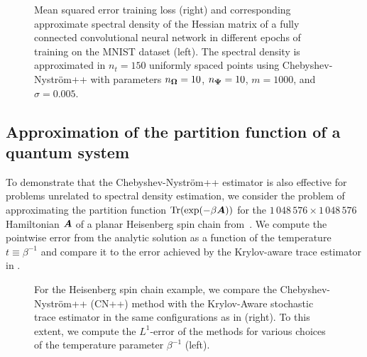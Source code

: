 \begin{figure}
    \begin{minipage}[c]{.49\linewidth}
        \centering
        
    \end{minipage}\hfill%
    \begin{minipage}[c]{.49\linewidth}
        \centering
        
    \end{minipage}
    \caption{Mean squared error training loss (right) and corresponding approximate spectral density of the Hessian matrix of a fully connected convolutional neural network in different epochs of training on the MNIST dataset (left). The spectral density is approximated in $n_t=150$ uniformly spaced points using Chebyshev-Nyström++ with parameters $n_{\boldsymbol{\Omega}} = 10$, $n_{\boldsymbol{\Psi}} = 10$, $m = 1000$, and $\sigma = 0.005$.}
    \label{fig:hessian-density}
\end{figure}

\subsection{Approximation of the partition function of a quantum system}
\label{subsec:spin-chain}

To demonstrate that the Chebyshev-Nyström++ estimator is also effective for problems unrelated to spectral density estimation, we consider the problem of approximating the partition function $\operatorname{Tr}(\exp(-\beta \boldsymbol{A}))$ for the $1\,048\,576 \times 1\,048\,576$ Hamiltonian $\boldsymbol{A}$ of a planar Heisenberg spin chain from~\cite[Section 5.1]{chen-2023-krylovaware-stochastic}. We compute the pointwise error from the analytic solution as a function of the temperature $t\equiv \beta^{-1}$ and compare it to the error achieved by the Krylov-aware trace estimator in .

\begin{figure}[ht]
    \begin{minipage}[c]{.475\linewidth}
        \centering
        
    \end{minipage}\hfill%
    \begin{minipage}[c]{.475\linewidth}
        \vspace{-35pt}
        
        \newline
        \vspace{15pt}
        \newline
        
    \end{minipage}
    \caption{For the Heisenberg spin chain example, we compare the Chebyshev-Nyström++ (CN++) method with the Krylov-Aware stochastic trace estimator in the same configurations as in \cite[Table 5.1]{chen-2023-krylovaware-stochastic} (right). To this extent, we compute the $L^1$-error of the methods for various choices of the temperature parameter $\beta^{-1}$ (left).}
    \label{fig:krylov-aware-spin}
\end{figure}

